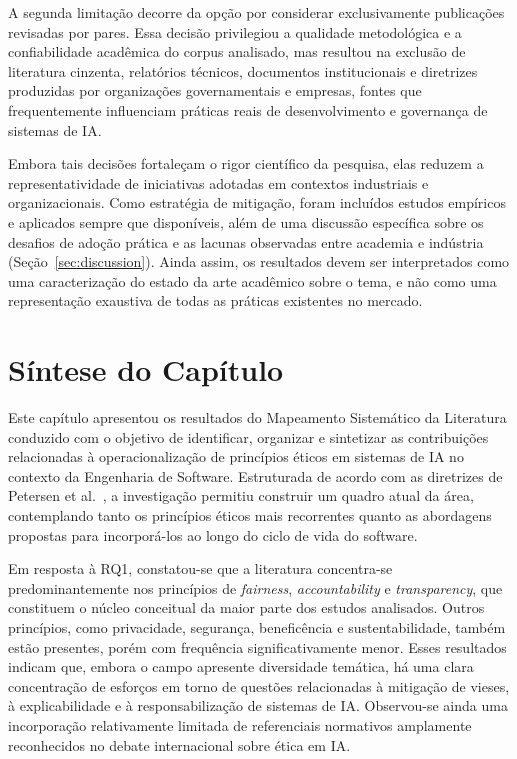 A segunda limitação decorre da opção por considerar exclusivamente publicações revisadas por pares. Essa decisão privilegiou a qualidade metodológica e a confiabilidade acadêmica do corpus analisado, mas resultou na exclusão de literatura cinzenta, relatórios técnicos, documentos institucionais e diretrizes produzidas por organizações governamentais e empresas, fontes que frequentemente influenciam práticas reais de desenvolvimento e governança de sistemas de IA.

Embora tais decisões fortaleçam o rigor científico da pesquisa, elas reduzem a representatividade de iniciativas adotadas em contextos industriais e organizacionais. Como estratégia de mitigação, foram incluídos estudos empíricos e aplicados sempre que disponíveis, além de uma discussão específica sobre os desafios de adoção prática e as lacunas observadas entre academia e indústria (Seção~\ref{sec:discussion}). Ainda assim, os resultados devem ser interpretados como uma caracterização do estado da arte acadêmico sobre o tema, e não como uma representação exaustiva de todas as práticas existentes no mercado.

\section{Síntese do Capítulo}
\label{sec:sintese-msl}

Este capítulo apresentou os resultados do Mapeamento Sistemático da Literatura conduzido com o objetivo de identificar, organizar e sintetizar as contribuições relacionadas à operacionalização de princípios éticos em sistemas de IA no contexto da Engenharia de Software. Estruturada de acordo com as diretrizes de Petersen et al.~\cite{Petersen2015}, a investigação permitiu construir um quadro atual da área, contemplando tanto os princípios éticos mais recorrentes quanto as abordagens propostas para incorporá-los ao longo do ciclo de vida do software.

Em resposta à RQ1, constatou-se que a literatura concentra-se predominantemente nos princípios de \textit{fairness}, \textit{accountability} e \textit{transparency}, que constituem o núcleo conceitual da maior parte dos estudos analisados. Outros princípios, como privacidade, segurança, beneficência e sustentabilidade, também estão presentes, porém com frequência significativamente menor. Esses resultados indicam que, embora o campo apresente diversidade temática, há uma clara concentração de esforços em torno de questões relacionadas à mitigação de vieses, à explicabilidade e à responsabilização de sistemas de IA. Observou-se ainda uma incorporação relativamente limitada de referenciais normativos amplamente reconhecidos no debate internacional sobre ética em IA.

